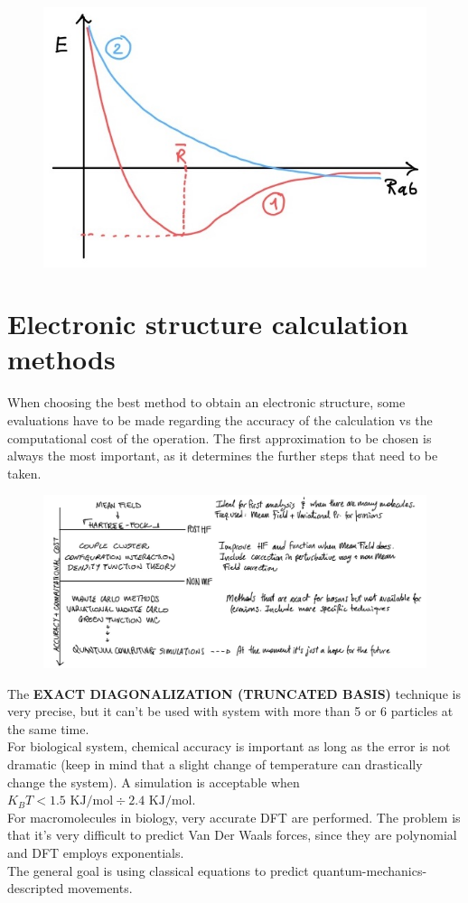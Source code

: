 \begin{figure}[htbp!]
	\centering
	\includegraphics[scale=0.30]{img_9}
\end{figure}

\section{Electronic structure calculation methods}
When choosing the best method to obtain an electronic structure, some evaluations have to be made regarding the accuracy of the calculation vs the computational cost of the operation. 
The first approximation to be chosen is always the most important, as it determines the further steps that need to be taken. \\
\begin{figure}[htbp!]
	\centering
	\includegraphics[scale=0.30]{img_13}
\end{figure}
\newline
The \textbf{EXACT DIAGONALIZATION (TRUNCATED BASIS)} technique is very precise, but it can't be used with system with more than 5 or 6 particles at the same time.\\
For biological system, chemical accuracy is important as long as the error is not dramatic (keep in mind that a slight change of temperature can drastically change the system). 
A simulation is acceptable when $K_BT < 1.5\text{ KJ/mol} \div 2.4 \text{ KJ/mol}$.\\
For macromolecules in biology, very accurate DFT are performed. The problem is that it's very difficult to predict Van Der Waals forces, since they are polynomial and DFT employs exponentials.\\
The general goal is using classical equations to predict quantum-mechanics-descripted movements.\\

